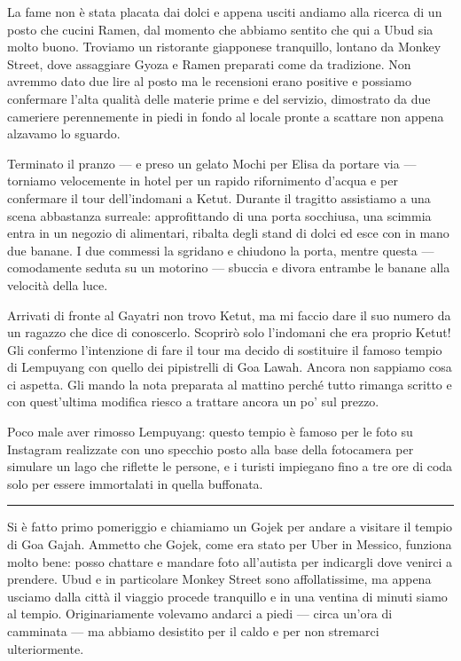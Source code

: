 La fame non è stata placata dai dolci e appena usciti andiamo alla ricerca di un posto che cucini Ramen, dal momento che abbiamo sentito che qui a Ubud sia molto buono. Troviamo un ristorante giapponese tranquillo, lontano da Monkey Street, dove assaggiare Gyoza e Ramen preparati come da tradizione. Non avremmo dato due lire al posto ma le recensioni erano positive e possiamo confermare l'alta qualità delle materie prime e del servizio, dimostrato da due cameriere perennemente in piedi in fondo al locale pronte a scattare non appena alzavamo lo sguardo.

Terminato il pranzo — e preso un gelato Mochi per Elisa da portare via — torniamo velocemente in hotel per un rapido rifornimento d'acqua e per confermare il tour dell'indomani a Ketut. Durante il tragitto assistiamo a una scena abbastanza surreale: approfittando di una porta socchiusa, una scimmia entra in un negozio di alimentari, ribalta degli stand di dolci ed esce con in mano due banane. I due commessi la sgridano e chiudono la porta, mentre questa — comodamente seduta su un motorino — sbuccia e divora entrambe le banane alla velocità della luce.

Arrivati di fronte al Gayatri non trovo Ketut, ma mi faccio dare il suo numero da un ragazzo che dice di conoscerlo. Scoprirò solo l'indomani che era proprio Ketut! Gli confermo l'intenzione di fare il tour ma decido di sostituire il famoso tempio di Lempuyang con quello dei pipistrelli di Goa Lawah. Ancora non sappiamo cosa ci aspetta. Gli mando la nota preparata al mattino perché tutto rimanga scritto e con quest'ultima modifica riesco a trattare ancora un po' sul prezzo.

Poco male aver rimosso Lempuyang: questo tempio è famoso per le foto su Instagram realizzate con uno specchio posto alla base della fotocamera per simulare un lago che riflette le persone, e i turisti impiegano fino a tre ore di coda solo per essere immortalati in quella buffonata.

\begin{center}
    \noindent\rule{0.6\textwidth}{0.4pt}
\end{center}

Si è fatto primo pomeriggio e chiamiamo un Gojek per andare a visitare il tempio di Goa Gajah. Ammetto che Gojek, come era stato per Uber in Messico, funziona molto bene: posso chattare e mandare foto all'autista per indicargli dove venirci a prendere. Ubud e in particolare Monkey Street sono affollatissime, ma appena usciamo dalla città il viaggio procede tranquillo e in una ventina di minuti siamo al tempio. Originariamente volevamo andarci a piedi — circa un'ora di camminata — ma abbiamo desistito per il caldo e per non stremarci ulteriormente.

